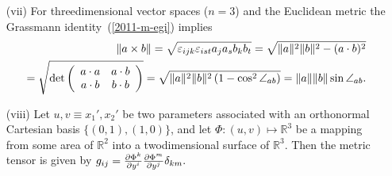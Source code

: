 \begin{itemize}
\item[(vii)]
For threedimensional vector spaces ($n=3$) and the Euclidean metric the Grassmann identity~(\ref{2011-m-egi})
  implies\\
\begin{equation}
\begin{split}
\| a\times b \| =
\sqrt{\varepsilon_{ijk}\varepsilon_{ist}a_j a_s b_k b_t} =
\sqrt{\| a\|^2
\| b\|^2
-(a\cdot b)^2}\\=
\sqrt{{\rm det}
\left(
\begin{array}{cc}
a\cdot a&a\cdot b\\
a\cdot b&b\cdot b
\end{array}\right)} =
\sqrt{\| a\|^2
\| b\|^2 \left (1- \cos^2 \angle_{ab} \right)}
 =
\| a\|
\| b\|
\sin \angle_{ab}.
\end{split}
\end{equation}
\item[(viii)]
Let $u,v\equiv x_1',x_2'$ be two parameters associated with an
orthonormal Cartesian basis $\{(0,1),(1,0)\}$, and let
$\Phi :(u,v)\mapsto \mathbb{R}^3$
be a mapping from some area of $\mathbb{R}^2$ into a twodimensional
surface of $\mathbb{R}^3$. Then the metric tensor is given by
$g_{ij}=
{\partial \Phi^k \over \partial  y ^i}
{\partial \Phi^m \over \partial  y^j} \delta_{km}.$

\end{itemize}







